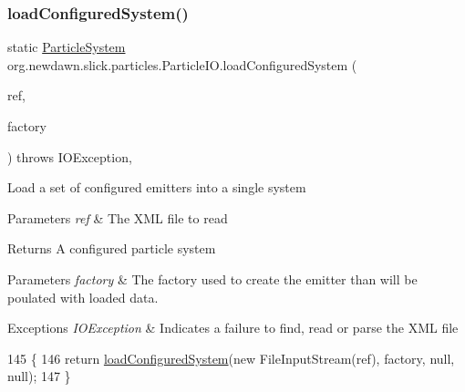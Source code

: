 \subsubsection{\texorpdfstring{load\+Configured\+System()}{loadConfiguredSystem()}\hspace{0.1cm}{\footnotesize\ttfamily [7/9]}}
{\footnotesize\ttfamily static \mbox{\hyperlink{classorg_1_1newdawn_1_1slick_1_1particles_1_1_particle_system}{Particle\+System}} org.\+newdawn.\+slick.\+particles.\+Particle\+I\+O.\+load\+Configured\+System (\begin{DoxyParamCaption}\item[{File}]{ref,  }\item[{\mbox{\hyperlink{interfaceorg_1_1newdawn_1_1slick_1_1particles_1_1_configurable_emitter_factory}{Configurable\+Emitter\+Factory}}}]{factory }\end{DoxyParamCaption}) throws I\+O\+Exception\hspace{0.3cm}{\ttfamily [inline]}, {\ttfamily [static]}}

Load a set of configured emitters into a single system


\begin{DoxyParams}{Parameters}
{\em ref} & The X\+ML file to read \\
\hline
\end{DoxyParams}
\begin{DoxyReturn}{Returns}
A configured particle system 
\end{DoxyReturn}

\begin{DoxyParams}{Parameters}
{\em factory} & The factory used to create the emitter than will be poulated with loaded data. \\
\hline
\end{DoxyParams}

\begin{DoxyExceptions}{Exceptions}
{\em I\+O\+Exception} & Indicates a failure to find, read or parse the X\+ML file \\
\hline
\end{DoxyExceptions}

\begin{DoxyCode}
145                                                                    \{
146       \textcolor{keywordflow}{return} \mbox{\hyperlink{classorg_1_1newdawn_1_1slick_1_1particles_1_1_particle_i_o_a1da2bcc8784c9cf967326954bc3c9d33}{loadConfiguredSystem}}(\textcolor{keyword}{new} FileInputStream(ref), factory, null, null);
147     \}
\end{DoxyCode}
\mbox{\label{classorg_1_1newdawn_1_1slick_1_1particles_1_1_particle_i_o_ac80838fce5476faff35b22c95727f63a}} 
